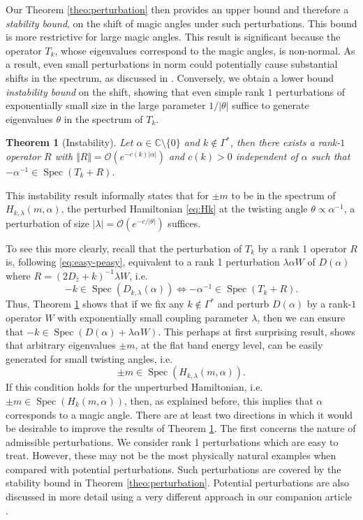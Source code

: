 \documentclass[reqno,12pt,letterpaper]{amsart}
\newtheorem{theo}{Theorem}
\numberwithin{equation}{section}
\DeclareMathOperator{\Spec}{Spec}
\begin{document}
Our Theorem \ref{theo:perturbation} then provides an upper bound and therefore a \emph{stability bound}, on the shift of magic angles under such perturbations. This bound is more restrictive for large magic angles. This result is significant because the operator $T_k$, whose eigenvalues correspond to the magic angles, is non-normal. As a result, even small perturbations in norm could potentially cause substantial shifts in the spectrum, as discussed in \cite[Theo. 10.2]{ET05}. 
 Conversely, we obtain a lower bound \emph{instability bound} on the shift, showing that even simple rank $1$ perturbations of exponentially small size in the large parameter $1/\vert \theta \vert$ suffice to generate eigenvalues $\theta$ in the spectrum of $T_k$.
\begin{theo}[Instability]
\label{theo:instability}
Let $\alpha \in \mathbb C \setminus \{0\}$ and $k \notin \Gamma^*$, then there exists a rank-$1$ operator $R$ with $\Vert R \Vert = \mathcal O(e^{-c(k) \vert \alpha \vert})$ and $c(k)>0$ independent of $\alpha$ such that $-\alpha^{-1} \in \Spec(T_{k}+R)$.
\end{theo}
This instability result informally states that for $\pm m$ to be in the spectrum of $H_{k,\lambda}(m,\alpha)$, the perturbed Hamiltonian \eqref{eq:Hk} at the twisting angle $\theta \propto \alpha^{-1}$,  a perturbation of size $\vert \lambda \vert = \mathcal O(e^{-c/\vert \theta \vert})$ suffices. 

To see this more clearly, recall that the perturbation of $T_k$ by a rank 1 operator $R$ is, following \eqref{eq:easy-peasy}, equivalent to a rank 1 perturbation $\lambda \alpha W$ of $D(\alpha)$ where $R = (2D_{\bar z}+k)^{-1}\lambda W$, i.e. 
\[ -k \in \Spec(D_{k,\lambda}(\alpha)) \Longleftrightarrow -\alpha^{-1} \in \Spec(T_k +R).\]
Thus, Theorem \ref{theo:instability} shows that if we fix any $k \notin \Gamma^*$ and perturb $D(\alpha)$ by a rank-$1$ operator $W$ with exponentially small coupling parameter $\lambda$,  then we can ensure that $-k \in \Spec(D(\alpha)+\lambda \alpha  W).$ This perhaps at first surprising result, shows that arbitrary eigenvalues $\pm m$, at the flat band energy level, can be easily generated for small twisting angles, i.e.
\[ \pm m \in \Spec(H_{k,\lambda}(m,\alpha)).  \]
If this condition holds for the unperturbed Hamiltonian, i.e. $\pm m \in  \Spec(H_{k}(m,\alpha))$, then, as explained before, this implies that $\alpha$ corresponds to a magic angle. 
There are at least two directions in which it would be desirable to improve the results of Theorem \ref{theo:instability}. The first concerns the nature of admissible perturbations. 
We consider rank 1 perturbations which are easy to treat. However, these may not be the most physically natural examples when compared with potential perturbations.  Such perturbations are covered by the stability bound in Theorem \ref{theo:perturbation}. Potential perturbations are also discussed in more detail using a very different approach in our companion article \cite{bov}.
\end{document}

